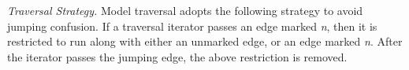 \textit{Traversal Strategy.} 
Model traversal adopts the following strategy to avoid jumping confusion. If a traversal iterator passes an edge marked \textit{n}, then it is restricted to run along with either an unmarked edge, or an edge marked \textit{n}. After the iterator passes the jumping edge, the above restriction is removed.










  






